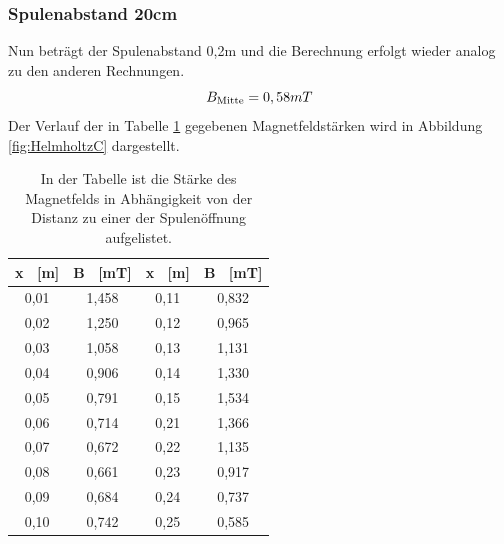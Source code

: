 \documentclass[titlepage = firstcover]{scrartcl}
\begin{document}
            \subsubsection{Spulenabstand 20cm}
            Nun beträgt der Spulenabstand 0,2m und die Berechnung erfolgt wieder analog zu den anderen Rechnungen.
            \begin{equation}
                B_{\text{Mitte}} = 0,58 mT \\
                \label{eqn:HelmC}
            \end{equation} 
            Der Verlauf der in Tabelle \ref{tab:HelmholtzC} gegebenen Magnetfeldstärken wird in Abbildung \ref{fig:HelmholtzC} dargestellt. 
            \begin{table}[h]
                \centering 
                \caption{In der Tabelle ist die Stärke des Magnetfelds in Abhängigkeit von der Distanz zu einer der Spulenöffnung aufgelistet.}
                \label{tab:HelmholtzC}

                \begin{tabular}{c c c c}
                    \toprule
                    {x \ [m]} & {B \ [mT]} & {x \ [m]} & {B \ [mT]} \\
                    \midrule
                    0,01 & 1,458 & 0,11 & 0,832 \\
                    0,02 & 1,250 & 0,12 & 0,965 \\
                    0,03 & 1,058 & 0,13 & 1,131 \\
                    0,04 & 0,906 & 0,14 & 1,330 \\
                    0,05 & 0,791 & 0,15 & 1,534 \\
                    0,06 & 0,714 & 0,21 & 1,366 \\
                    0,07 & 0,672 & 0,22 & 1,135 \\
                    0,08 & 0,661 & 0,23 & 0,917 \\
                    0,09 & 0,684 & 0,24 & 0,737 \\
                    0,10 & 0,742 & 0,25 & 0,585 \\
                    \bottomrule
                \end{tabular}                
            \end{table}
\end{document}
